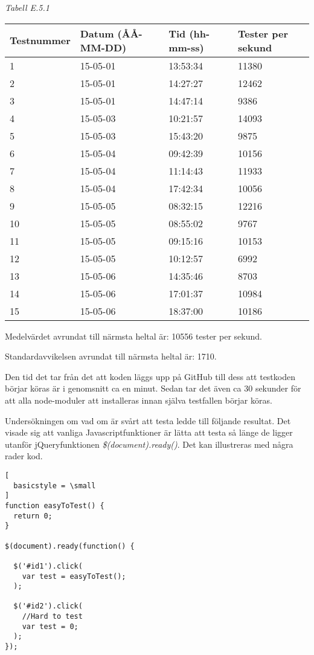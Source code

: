 \noindent\emph{Tabell E.5.1}
\begin{center}
  \begin{tabular}{| l | l | l | l |}
  \hline
  Testnummer & Datum (ÅÅ-MM-DD) & Tid (hh-mm-ss) & Tester per sekund\\ \hline
  1 & 15-05-01 & 13:53:34 & 11380\\ \hline
  2 & 15-05-01 & 14:27:27 & 12462\\ \hline
  3 & 15-05-01 & 14:47:14 & 9386\\ \hline 
  4 & 15-05-03 & 10:21:57 & 14093\\ \hline 
  5 & 15-05-03 & 15:43:20 & 9875\\ \hline 
  6 & 15-05-04 & 09:42:39 & 10156\\ \hline 
  7 & 15-05-04 & 11:14:43 & 11933\\ \hline 
  8 & 15-05-04 & 17:42:34 & 10056\\ \hline 
  9 & 15-05-05 & 08:32:15 & 12216\\ \hline 
  10 & 15-05-05 & 08:55:02 & 9767\\ \hline 
  11 & 15-05-05 & 09:15:16 & 10153\\ \hline 
  12 & 15-05-05 & 10:12:57 & 6992\\ \hline 
  13 & 15-05-06 & 14:35:46 & 8703\\ \hline 
  14 & 15-05-06 & 17:01:37 & 10984\\ \hline 
  15 & 15-05-06 & 18:37:00 & 10186\\ \hline 
  \end{tabular}
\end{center}

Medelvärdet avrundat till närmsta heltal är: 10556 tester per sekund.

Standardavvikelsen avrundat till närmsta heltal är: 1710.

Den tid det tar från det att koden läggs upp på GitHub till dess att 
testkoden börjar köras är i genomsnitt ca en minut. Sedan tar det även ca 30
sekunder för att alla node-moduler att installeras innan själva
testfallen börjar köras.

Undersökningen om vad om är svårt att testa ledde till följande resultat.
Det visade sig att vanliga Javascriptfunktioner är lätta
att testa så länge de ligger utanför jQueryfunktionen
\emph{\$(document).ready()}. Det kan illustreras med några
rader kod.

\begin{lstlisting}[
  basicstyle = \small
]
function easyToTest() {
  return 0;
}

$(document).ready(function() {

  $('#id1').click(
    var test = easyToTest(); 
  );

  $('#id2').click(
    //Hard to test
    var test = 0; 
  );
});

\end{lstlisting}

